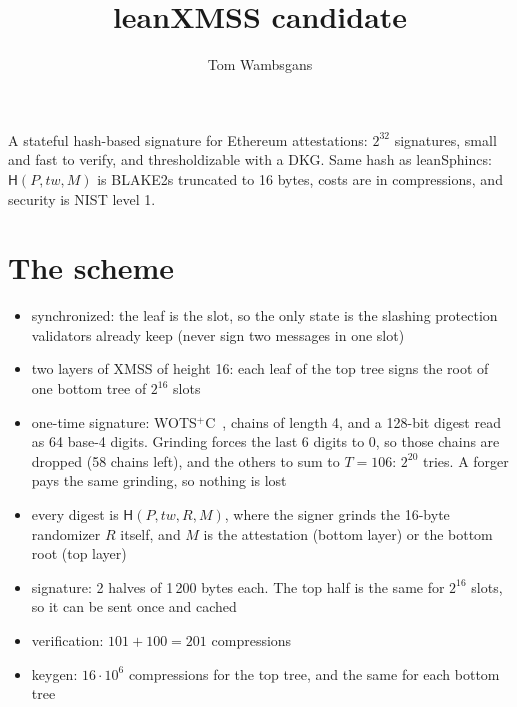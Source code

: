 \documentclass[11pt]{article}
\title{leanXMSS candidate}
\author{Tom Wambsgans}
\date{}
\newcommand{\hash}{\mathsf{H}}
\begin{document}
\maketitle
\vspace{-3em}

\begin{center}
\end{center}

A stateful hash-based signature for Ethereum attestations: $2^{32}$ signatures, small and fast to verify,
and thresholdizable with a DKG. Same hash as leanSphincs: $\hash(P,\mathit{tw},M)$ is BLAKE2s truncated to
16 bytes, costs are in compressions, and security is NIST level 1.

\section{The scheme}

\begin{itemize}
  \item synchronized: the leaf is the slot, so the only state is the slashing protection validators
        already keep (never sign two messages in one slot)
  \item two layers of XMSS of height 16: each leaf of the top tree signs the root of one bottom tree of
        $2^{16}$ slots
  \item one-time signature: WOTS$^+$C~\cite{HK22C}, chains of length 4, and a 128-bit digest read as 64
        base-4 digits. Grinding forces the last 6 digits to 0, so those chains are dropped (58 chains
        left), and the others to sum to $T=106$: $2^{20}$ tries. A forger pays the same grinding, so nothing is lost
  \item every digest is $\hash(P,\mathit{tw},R,M)$, where the signer grinds the 16-byte randomizer $R$
        itself, and $M$ is the attestation (bottom layer) or the bottom root (top layer)
\end{itemize}

\begin{itemize}
  \item signature: 2 halves of 1\,200 bytes each. The top half is the same for $2^{16}$ slots, so it can
        be sent once and cached
  \item verification: $101+100=201$ compressions
  \item keygen: $16\cdot10^6$ compressions for the top tree, and the same for each bottom tree
\end{itemize}
\end{document}
